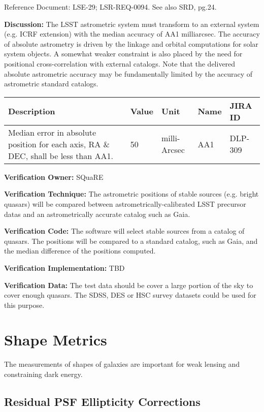 Reference Document: LSE-29; LSR-REQ-0094. See also SRD, pg.24.

\textbf{Discussion:} The LSST astrometric system must transform to an
external system (e.g. ICRF extension) with the median accuracy of AA1
milliarcsec. The accuracy of absolute astrometry is driven by the
linkage and orbital computations for solar system objects. A somewhat
weaker constraint is also placed by the need for positional
cross-correlation with external catalogs. Note that the delivered
absolute astrometric accuracy may be fundamentally limited by the
accuracy of astrometric standard catalogs.

\begin{longtable}[]{@{}lllll@{}}
\toprule
Description & Value & Unit & Name & JIRA ID\tabularnewline
\midrule
\endhead
Median error in absolute position for each axis, RA \& DEC, shall be
less than AA1. & 50 & milli-Arcsec & AA1 & DLP-309\tabularnewline
\bottomrule
\end{longtable}

\textbf{Verification Owner:} SQuaRE

\textbf{Verification Technique:} The astrometric positions of stable
sources (e.g. bright quasars) will be compared between
astrometrically-calibrated LSST precursor datas and an astrometrically
accurate catalog such as Gaia.

\textbf{Verification Code:} The software will select stable sources from
a catalog of quasars. The positions will be compared to a standard
catalog, such as Gaia, and the median difference of the positions
computed.

\textbf{Verification Implementation:} TBD

\textbf{Verification Data:} The test data should be cover a large
portion of the sky to cover enough quasars. The SDSS, DES or HSC survey
datasets could be used for this purpose.

\section{Shape Metrics}\label{shape-metrics}

The measurements of shapes of galaxies are important for weak lensing
and constraining dark energy.

\subsection{Residual PSF Ellipticity
Corrections}\label{residual-psf-ellipticity-corrections}

